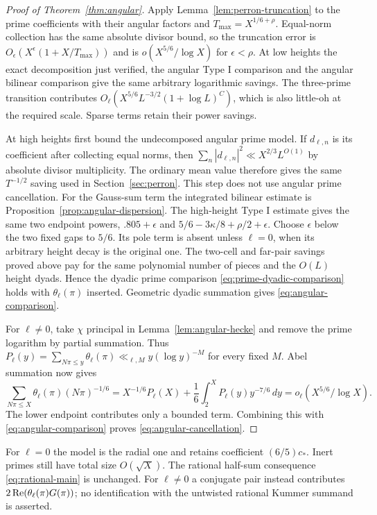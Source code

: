 \begin{proof}[Proof of Theorem~\ref{thm:angular}]
Apply Lemma~\ref{lem:perron-truncation} to the prime coefficients
with their angular factors and $T_{\max}=X^{1/6+\rho}$.
Equal-norm collection has the same absolute divisor bound,
so the truncation error is
$O_\epsilon(X^\epsilon(1+X/T_{\max}))$
and is $o(X^{5/6}/\log X)$ for $\epsilon<\rho$.
At low heights the exact decomposition just verified, the
angular Type I comparison and the angular bilinear comparison
give the same arbitrary logarithmic savings. The three-prime
transition contributes
$O_\ell(X^{5/6}L^{-3/2}(1+\log L)^C)$, which is also little-oh
at the required scale. Sparse terms retain their power savings.

At high heights first bound the undecomposed angular prime model.
If $d_{\ell,n}$ is its coefficient after collecting equal norms,
then $\sum_n|d_{\ell,n}|^2\ll X^{2/3}L^{O(1)}$ by absolute
divisor multiplicity. The ordinary mean value therefore gives
the same $T^{-1/2}$ saving used in Section~\ref{sec:perron}.
This step does not use angular prime cancellation.
For the Gauss-sum term the integrated bilinear estimate is
Proposition~\ref{prop:angular-dispersion}. The high-height
Type I estimate gives the same two endpoint powers,
$.805+\epsilon$ and $5/6-3\kappa/8+\rho/2+\epsilon$.
Choose $\epsilon$ below the two fixed gaps to $5/6$.
Its pole term is absent unless $\ell=0$, when its arbitrary
height decay is the original one. The two-cell and far-pair
savings proved above pay for the same polynomial number of
pieces and the $O(L)$ height dyads. Hence the dyadic prime
comparison \eqref{eq:prime-dyadic-comparison} holds with
$\theta_\ell(\pi)$ inserted. Geometric dyadic summation gives
\eqref{eq:angular-comparison}.

For $\ell\ne0$, take $\chi$ principal in
Lemma~\ref{lem:angular-hecke} and remove the prime logarithm by
partial summation. Thus
$P_\ell(y)=\sum_{N\pi\le y}\theta_\ell(\pi)
 \ll_{\ell,M}y(\log y)^{-M}$ for every fixed $M$.
Abel summation now gives
\[
 \sum_{N\pi\le X}\theta_\ell(\pi)(N\pi)^{-1/6}
 =X^{-1/6}P_\ell(X)
       +\frac16\int_2^X P_\ell(y)y^{-7/6}\,dy
 =o_\ell(X^{5/6}/\log X).
\]
The lower endpoint contributes only a bounded term. Combining
this with \eqref{eq:angular-comparison} proves
\eqref{eq:angular-cancellation}.
\end{proof}

For $\ell=0$ the model is the radial one and retains coefficient
$(6/5)c_*$. Inert primes still have total size $O(\sqrt X)$.
The rational half-sum consequence \eqref{eq:rational-main}
is unchanged. For $\ell\ne0$ a conjugate pair instead contributes
$2\operatorname{Re}(\theta_\ell(\pi)G(\pi))$; no identification with the
untwisted rational Kummer summand is asserted.

